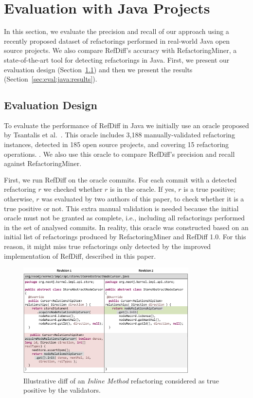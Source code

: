 \section{Evaluation with Java Projects}

In this section, we evaluate the precision and recall of our approach using a recently proposed dataset of refactorings performed in real-world Java open source projects. We also compare RefDiff's accuracy with RefactoringMiner, 
a state-of-the-art tool for detecting refactorings in Java.
First, we present our evaluation design (Section~\ref{sec:eval:java:design}) and then we present the results (Section~\ref{sec:eval:java:results}).

\subsection{Evaluation Design}
\label{sec:eval:java:design}

To evaluate the performance of RefDiff in Java we initially use an oracle proposed by Tsantalis et al.~\cite{tsantalis2018rminer}. This oracle includes 3,188 manually-validated refactoring instances, detected in 185 open source projects, and covering 15 refactoring operations. . We also use this oracle to compare RefDiff's precision and recall against RefactoringMiner.

First, we run RefDiff on the oracle commits. For each commit with a detected refactoring $r$ we checked whether $r$ is in the oracle. If yes, $r$ is a true positive; otherwise, $r$ was evaluated by two authors of this paper, to check whether it is a true positive or not. This extra manual validation is needed because the initial oracle must not be granted as complete, i.e., including all refactorings performed in the set of analysed commits. In reality, this oracle was constructed based on an initial list of refactorings produced by RefactoringMiner and RefDiff 1.0. For this reason, it might miss true refactorings only detected by the improved implementation of RefDiff, described in this paper.

\begin{figure}[!t]
\centering
\includegraphics[width=0.8\textwidth]{img/diff2.pdf}
\caption{Illustrative diff of an \emph{Inline Method} refactoring considered as true positive by the validators.}
\label{FigDiff2}
\end{figure}

